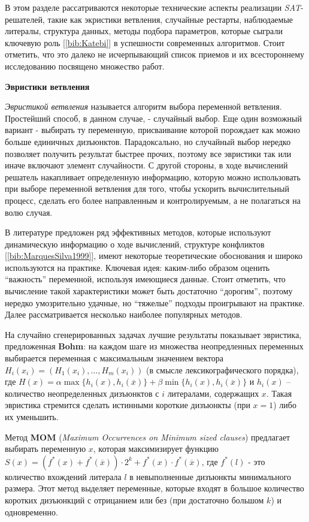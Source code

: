 В этом разделе рассатриваются некоторые технические аспекты реализации \textit{SAT}-решателей, такие как экристики ветвления, случайные рестарты, наблюдаемые литералы, структура данных, методы подбора параметров, которые сыграли ключевую роль [\ref{bib:Katebi}] в успешности современных алгоритмов. Стоит отметить, что это далеко не исчерпывающий список приемов и их всестороннему исследованию посвящено множество работ.

\textbf{Эвристики ветвления}

\textit{Эвристикой ветвления} называется алгоритм выбора переменной ветвления. Простейший способ, в данном случае, - случайный выбор. Еще один возможный вариант - выбирать ту переменную, присваивание которой порождает как можно больше единичных дизъюнктов.
Парадоксально, но случайный выбор нередко позволяет получить результат быстрее прочих, поэтому все эвристики так или иначе включают элемент случайности. 
С другой стороны, в ходе вычислений решатель накапливает определенную информацию, которую можно использовать при выборе переменной ветвления для того, чтобы ускорить вычислительный процесс, сделать его более направленным и контролируемым, а не полагаться на волю случая. 

В литературе предложен ряд эффективных методов, которые используют динамическую информацию о ходе вычислений, 
структуре конфликтов [\ref{bib:MarquesSilva1999}], имеют некоторые теоретические обоснования и широко используются на практике. 
Ключевая идея: каким-либо образом оценить \enquote{важность} переменной, используя имеющиеся данные. Стоит отметить, что вычисление такой характеристики может быть достаточно \enquote{дорогим}, поэтому нередко умозрительно удачные, но \enquote{тяжелые} подходы проигрывают на практике. Далее рассматривается несколько наиболее популярных методов.

На случайно сгенерированных задачах лучшие результаты показывает эвристика, предложенная \textbf{Bohm}: на каждом шаге из множества неопредленных переменных выбирается переменная с максимальным значением вектора 
$H_i(x_i) = \left(H_1(x_i), \dots, H_m(x_i)\right)$ 
(в смысле лексикографического порядка), где
$H(x) = \alpha \max \{ h_i(x), h_i(\overline{x}) \} + \beta \min \{ h_i(x), h_i(\overline{x}) \}$
и $h_i(x)$ -- количество неопределенных дизъюнктов с $i$ литералами, содержащих $x$.
Такая эвристика стремится сделать истинными короткие дизъюнкты (при $x=1$) либо их уменьшить.

Метод \textbf{MOM} (\textit{Maximum Occurrences on Minimum sized clauses}) предлагает выбирать переменную $x$, которая максимизирует функцию 
$S(x) = \left(f^{*}(x) + f^{*}(\overline{x})\right) \cdot 2^{k} + f^{*}(x) \cdot f^{*}(\overline{x})$, где $f^{*}(l)$ - это количество вхождений литерала $l$ в невыполненные дизъюнкты минимального размера. Этот метод выделяет переменные, которые входят в большое количество коротких дизъюнкций с отрицанием или без (при достаточно большом $k$) и одновременно.

